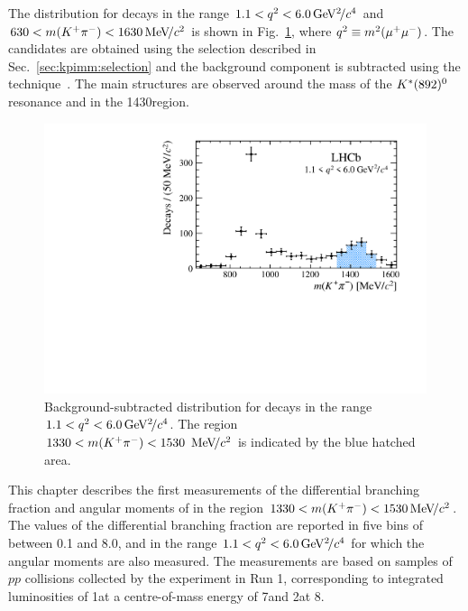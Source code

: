 The \mkpi distribution for \BdToKpimm decays in the range $1.1<{q^2}<6.0{\mathrm{\,Ge\kern -0.1em V^2\!/}c^4}$ and $630<m({{K}^+}{{\pi}^-})<1630{\mathrm{\,Me\kern -0.1em V\!/}c^2}$ is shown in Fig.~\ref{fig:full-mkpi}, where ${q^2} \equiv m^2({\mu^+} {\mu^-})$. The candidates are obtained using the selection described in Sec.~\ref{sec:kpimm:selection} and the background component is subtracted using the \sPlot technique~\cite{splot}. The main structures are observed around the mass of the ${{K}^*}(892)^{0}$ resonance and in the 1430\mevcc region. 

\begin{figure}[!tb]
 \centering
 \includegraphics[width=0.7\linewidth]{figs/kpimm/introduction/full-mkpi.pdf}
 \caption{Background-subtracted \mkpi distribution for \BdToKpimm decays in the range $1.1<{q^2}<6.0{\mathrm{\,Ge\kern -0.1em V^2\!/}c^4}$. The region $1330<m({{K}^+}{{\pi}^-})<1530~{\mathrm{\,Me\kern -0.1em V\!/}c^2}$ is indicated by the blue hatched area.}
\label{fig:full-mkpi}
\end{figure}

This chapter describes the first measurements of the differential branching fraction and angular moments of \BdToKpimm in the region $1330<m({{K}^+}{{\pi}^-})<1530{\mathrm{\,Me\kern -0.1em V\!/}c^2}$. The values of the differential branching fraction are reported in five bins of \qsq between 0.1 and 8.0\gevgevcccc, and in the range $1.1<{q^2}<6.0{\mathrm{\,Ge\kern -0.1em V^2\!/}c^4}$ for which the angular moments are also measured. The measurements are based on samples of $pp$ collisions collected by the \lhcb experiment in Run 1, corresponding to integrated luminosities of 1\invfb at a centre-of-mass energy of 7\tev and 2\invfb at 8\tev.  